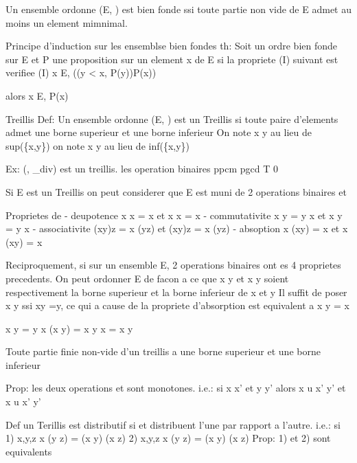 \documentclass{article}
\begin{document}
Un ensemble ordonne (E, \leq) est bien fonde ssi toute partie non vide de E admet au moins un element mimnimal.

Principe d'induction sur les ensemblse bien fondes
th: Soit \leq un ordre bien fonde sur E et P une proposition sur un element x de E
si la propriete (I) suivant est verifiee (I) \forall x \in E, ((\forall y < x, P(y))\rightarrow P(x))

alors \forall x \in E, P(x)



Treillis
Def: Un ensemble ordonne (E, \leq) est un Treillis si toute paire d'elements admet une borne superieur et une borne inferieur
On note x \sqcup y au lieu de sup(\{x,y\})
on note x \sqcap y au lieu de inf(\{x,y\})

Ex: (\N, \leq_{div}) est un treillis.
les operation binaires 
\sqcup ppcm
\sqcap pgcd
 T 0


Si E est un Treillis on peut considerer que E est muni de 2 operations binaires \sqcup et \sqcap


Proprietes de \sqcap \sqcup
- deupotence x \sqcup x = x et x \sqcap x = x
- commutativite x \sqcup y = y \sqcup x et x \sqcap y = y \sqcap x
- associativite (x\sqcup y)\sqcup z = x \sqcup (y\sqcup z) et (x\sqcap y)\sqcap z = x \sqcap (y\sqcap z)
- absoption x \sqcap (x\sqcup y) = x et x \sqcup (x\sqcap y) = x

Reciproquement, si sur un ensemble E, 2 operations binaires ont es 4 proprietes precedents.
On peut ordonner E de facon a ce que x \sqcup y et x \sqcap y soient respectivement la borne superieur et la borne inferieur de x et y
Il suffit de poser x \leq y ssi x\sqcup y =y, ce qui a cause de la propriete d'absorption est equivalent a x \sqcap y = x

x \sqcup y = y \rightarrow x \sqcap (x \sqcup y) = x \sqcap y \rightarrow x = x \sqcap y

Toute partie finie non-vide d'un treillis a une borne superieur et une borne inferieur


Prop: les deux operations \sqcap et \sqcup sont monotones.
i.e.: 	si x \leq x' et y \leq y'
		alors x \sqcup u \leq x' \sqcup y'
			et x \sqcap u \leq x' \sqcap y'

Def un Terillis est distributif si \sqcap et \sqcup distribuent l'une par rapport a l'autre.
i.e.: si 
1) \forall x,y,z x \sqcup(y \sqcap z) = (x \sqcup y) \sqcap (x \sqcup z)
2) \forall x,y,z x \sqcap(y \sqcup z) = (x \sqcap y) \sqcup (x \sqcap z)
Prop: 1) et 2) sont equivalents
\end{document}

